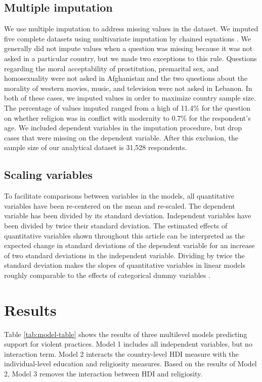 \documentclass[10pt,letterpaper]{article}
\begin{document}
\subsection*{Multiple imputation}

We use multiple imputation to address missing values in the dataset. We imputed five complete datasets using multivariate imputation by chained equations \cite{buuren_mice_2011}. We generally did not impute values when a question was missing because it was not asked in a particular country, but we made two exceptions to this rule. Questions regarding the moral acceptability of prostitution, premarital sex, and homosexuality were not asked in Afghanistan and the two questions about the morality of western movies, music, and television were not asked in Lebanon. In both of these cases, we imputed values in order to maximize country sample size. The percentage of values imputed ranged from a high of 11.4\% for the question on whether religion was in conflict with modernity to 0.7\% for the respondent's age. We included dependent variables in the imputation procedure, but drop cases that were missing on the dependent variable. After this exclusion, the sample size of our analytical dataset is 31,528 respondents.

\subsection*{Scaling variables}

To facilitate comparisons between variables in the models, all quantitative variables have been re-centered on the mean and re-scaled. The dependent variable has been divided by its standard deviation. Independent variables have been divided by twice their standard deviation. The estimated effects of quantitative variables shown throughout this article can be interpreted as the expected change in standard deviations of the dependent variable for an increase of two standard deviations in the independent variable. Dividing by twice the standard deviation makes the slopes of quantitative variables in linear models roughly comparable to the effects of categorical dummy variables \cite{gelman_scaling_2008}.

\section*{Results}

Table \ref{tab:model-table} shows the results of three multilevel models predicting support for violent practices. Model 1 includes all independent variables, but no interaction term. Model 2 interacts the country-level HDI measure with the individual-level education and religiosity measures. Based on the results of Model 2, Model 3 removes the interaction between HDI and religiosity.
\end{document}
